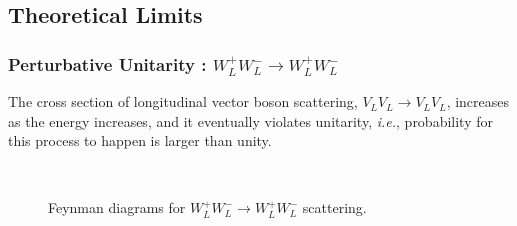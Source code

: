 \subsection{Theoretical Limits} 

\subsubsection{Perturbative Unitarity : $W_L^+W_L^- \rightarrow W_L^+W_L^-$}

The cross section of longitudinal vector boson scattering, $V_LV_L \to V_LV_L$, 
increases as the energy increases, and it eventually violates unitarity, 
\textit{i.e.}, probability for this process to happen is larger than unity. 

\begin{figure}[t]
\centering
{}
\hspace{0.5cm}
\hspace{0.5cm}
\\
\vspace{0.5cm}
\hspace{0.5cm}
\caption{Feynman diagrams for $W_L^+W_L^- \to W_L^+W_L^-$ scattering.} 
\label{fig:FD_unitary}
\end{figure}

